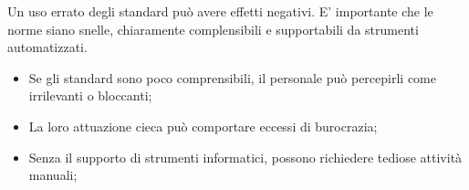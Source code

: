 Un uso errato degli standard può avere effetti negativi. E' importante che le
norme siano snelle, chiaramente complensibili e supportabili da strumenti
automatizzati.

\begin{itemize}
  \item Se gli standard sono poco comprensibili, il personale può percepirli
    come irrilevanti o bloccanti;
  \item La loro attuazione cieca può comportare eccessi di burocrazia;
  \item Senza il supporto di strumenti informatici, possono richiedere tediose
    attività manuali;
\end{itemize}

